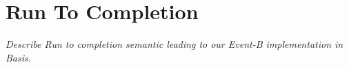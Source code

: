 

\section{Run To Completion}

\emph{Describe Run to completion semantic leading to our Event-B implementation in Basis.}
